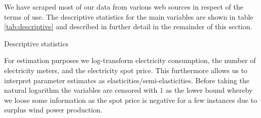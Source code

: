 \label{sec:data}
We have scraped most of our data from various web sources in respect of the terms of use. The descriptive statistics for the main variables are shown in table \ref{tab:descriptive} and described in further detail in the remainder of this section.
\begin{table}[H]
  \centering
  \caption{Descriptive statistics}
  \label{tab:descriptive}
  \footnotesize
    
\end{table}
For estimation purposes we log-transform electricity consumption, the number of electricity meters, and the electricity spot price. This furthermore allows us to interpret parameter estimates as elasticities/semi-elasticities. Before taking the natural logarithm the variables are censored with $1$ as the lower bound whereby we loose some information as the spot price is negative for a few instances due to surplus wind power production.

